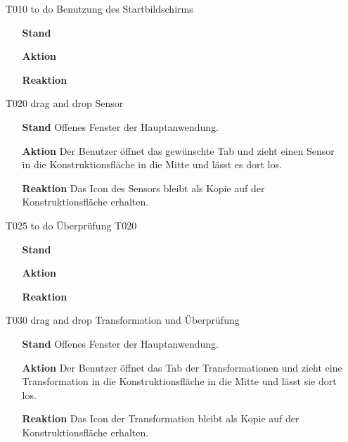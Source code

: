 \documentclass[parskip=full]{scrartcl}
\begin{document}
\begin{itemize} 

\item[T010] to do Benutzung des Startbildschirms
\begin{itemize}

\item []\textbf{Stand} 
\item []\textbf{Aktion} 
\item []\textbf{Reaktion} 

\end{itemize}


\item[T020] drag and drop Sensor
\begin{itemize}

\item []\textbf{Stand} Offenes Fenster der Hauptanwendung.
\item []\textbf{Aktion} Der Benutzer öffnet das gewünschte Tab und zieht einen Sensor in die Konstruktionsfläche in die Mitte und lässt es dort los.
\item []\textbf{Reaktion} Das Icon des Sensors bleibt als Kopie auf der Konstruktionsfläche erhalten.

\end{itemize}

\item[T025] to do Überprüfung T020
\begin{itemize}

\item[]\textbf {Stand} 
\item[]\textbf{Aktion} 
\item[]\textbf{Reaktion} 

\end{itemize}

\item[T030] drag and drop Transformation und Überprüfung
\begin{itemize}

\item []\textbf{Stand} Offenes Fenster der Hauptanwendung.
\item []\textbf{Aktion} Der Benutzer öffnet das Tab der Transformationen und zieht eine Transformation in die Konstruktionsfläche in die Mitte und lässt sie dort los.
\item []\textbf{Reaktion} Das Icon der Transformation bleibt als Kopie auf der Konstruktionsfläche erhalten. 

\end{itemize} 


\end{itemize}
\end{document}

